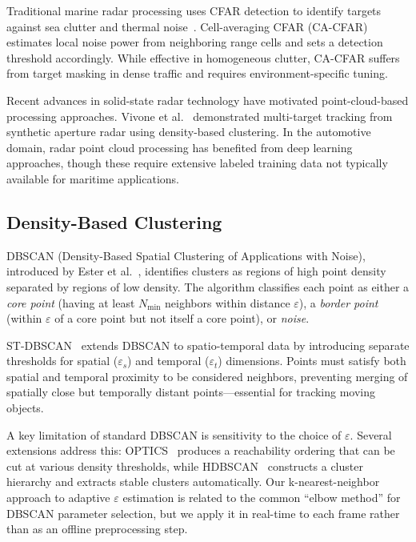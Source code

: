 \documentclass[conf]{new-aiaa}
\begin{document}
Traditional marine radar processing uses CFAR detection to identify targets against sea clutter and thermal noise~\cite{rohling1983radar}. Cell-averaging CFAR (CA-CFAR) estimates local noise power from neighboring range cells and sets a detection threshold accordingly. While effective in homogeneous clutter, CA-CFAR suffers from target masking in dense traffic and requires environment-specific tuning.

Recent advances in solid-state radar technology have motivated point-cloud-based processing approaches. Vivone et al.~\cite{vivone2016sar} demonstrated multi-target tracking from synthetic aperture radar using density-based clustering. In the automotive domain, radar point cloud processing has benefited from deep learning approaches, though these require extensive labeled training data not typically available for maritime applications.

\subsection{Density-Based Clustering}

DBSCAN (Density-Based Spatial Clustering of Applications with Noise), introduced by Ester et al.~\cite{ester1996density}, identifies clusters as regions of high point density separated by regions of low density. The algorithm classifies each point as either a \textit{core point} (having at least $N_{\min}$ neighbors within distance $\varepsilon$), a \textit{border point} (within $\varepsilon$ of a core point but not itself a core point), or \textit{noise}.

ST-DBSCAN~\cite{birant2007st} extends DBSCAN to spatio-temporal data by introducing separate thresholds for spatial ($\varepsilon_s$) and temporal ($\varepsilon_t$) dimensions. Points must satisfy both spatial and temporal proximity to be considered neighbors, preventing merging of spatially close but temporally distant points---essential for tracking moving objects.

A key limitation of standard DBSCAN is sensitivity to the choice of $\varepsilon$. Several extensions address this: OPTICS~\cite{ankerst1999optics} produces a reachability ordering that can be cut at various density thresholds, while HDBSCAN~\cite{campello2013hdbscan} constructs a cluster hierarchy and extracts stable clusters automatically. Our k-nearest-neighbor approach to adaptive $\varepsilon$ estimation is related to the common ``elbow method'' for DBSCAN parameter selection, but we apply it in real-time to each frame rather than as an offline preprocessing step.
\end{document}
